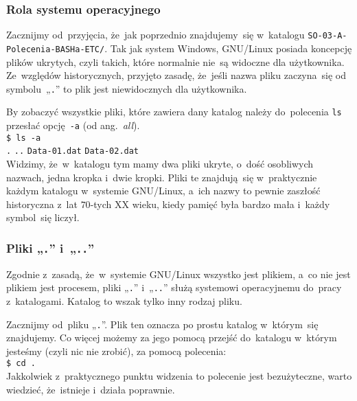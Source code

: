 \documentclass[10pt,t]{beamer}
\begin{document}
\begin{frame}
  \frametitle{Rola systemu operacyjnego}


  Zacznijmy od~przyjęcia, że~jak poprzednio znajdujemy~się w~katalogu
  \texttt{SO-03-A-Polecenia-BASHa-ETC/}. Tak jak system Windows,
  GNU/Linux posiada koncepcję plików ukrytych, czyli takich, które
  normalnie nie~są widoczne dla użytkownika. Ze~względów historycznych,
  przyjęto zasadę, że~jeśli nazwa pliku zaczyna~się od symbolu~„\texttt{.}”
  to plik jest niewidocznych dla użytkownika.

  By zobaczyć wszystkie pliki, które zawiera dany katalog należy
  do~polecenia \texttt{ls} przesłać opcję~\texttt{-a}
  (od ang.~\textit{all}). \\
  \texttt{\$ ls -a} \\
  \texttt{.} \quad \texttt{..} \quad \texttt{Data-01.dat} \quad
  \texttt{Data-02.dat} \quad {} \\
  Widzimy, że~w~katalogu tym mamy dwa pliki ukryte, o~dość osobliwych
  nazwach, jedna kropka i~dwie kropki. Pliki te znajdują~się w~praktycznie
  każdym katalogu w~systemie GNU/Linux, a~ich nazwy to pewnie zaszłość
  historyczna z~lat $70$-tych XX wieku, kiedy pamięć była bardzo mała
  i~każdy symbol~się liczył.

\end{frame}





\begin{frame}
  \frametitle{Pliki „\texttt{.}” i~„\texttt{..}”}


  Zgodnie z~zasadą, że~w~systemie GNU/Linux wszystko jest plikiem, a~co nie
  jest plikiem jest procesem, pliki „\texttt{.}” i~„\texttt{..}” służą
  systemowi operacyjnemu do~pracy z~katalogami. Katalog to wszak tylko inny
  rodzaj pliku.

  Zacznijmy od~pliku „\texttt{.}”. Plik ten oznacza po prostu katalog
  w~którym~się znajdujemy. Co więcej możemy za jego pomocą przejść
  do~katalogu w~którym jesteśmy (czyli nic nie zrobić), za pomocą
  polecenia: \\
  \texttt{\$ cd .} \\
  Jakkolwiek z~praktycznego punktu widzenia to polecenie jest bezużyteczne,
  warto wiedzieć, że~istnieje i~działa poprawnie.

\end{frame}
\end{document}
